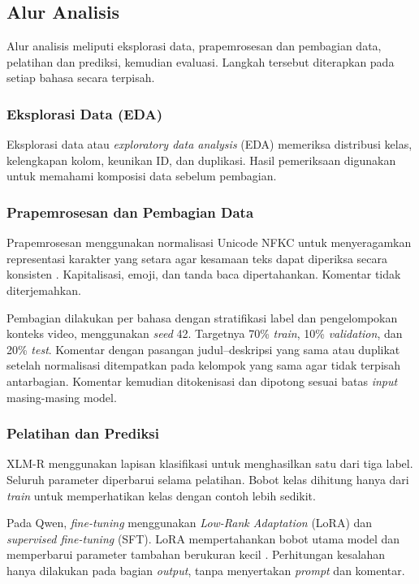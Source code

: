 \documentclass[11pt]{article}
\begin{document}
\subsection{Alur Analisis}
Alur analisis meliputi eksplorasi data, prapemrosesan dan pembagian data, pelatihan dan prediksi, kemudian evaluasi. Langkah tersebut diterapkan pada setiap bahasa secara terpisah.

\subsubsection{Eksplorasi Data (EDA)}
Eksplorasi data atau \textit{exploratory data analysis} (EDA) memeriksa distribusi kelas, kelengkapan kolom, keunikan ID, dan duplikasi. Hasil pemeriksaan digunakan untuk memahami komposisi data sebelum pembagian.

\subsubsection{Prapemrosesan dan Pembagian Data}
Prapemrosesan menggunakan normalisasi Unicode NFKC untuk menyeragamkan representasi karakter yang setara agar kesamaan teks dapat diperiksa secara konsisten \citep{unicode-consortium-2026-normalization}. Kapitalisasi, emoji, dan tanda baca dipertahankan. Komentar tidak diterjemahkan.

Pembagian dilakukan per bahasa dengan stratifikasi label dan pengelompokan konteks video, menggunakan \textit{seed} 42. Targetnya 70\% \textit{train}, 10\% \textit{validation}, dan 20\% \textit{test}. Komentar dengan pasangan judul--deskripsi yang sama atau duplikat setelah normalisasi ditempatkan pada kelompok yang sama agar tidak terpisah antarbagian. Komentar kemudian ditokenisasi dan dipotong sesuai batas \textit{input} masing-masing model.

\subsubsection{Pelatihan dan Prediksi}
XLM-R menggunakan lapisan klasifikasi untuk menghasilkan satu dari tiga label. Seluruh parameter diperbarui selama pelatihan. Bobot kelas dihitung hanya dari \textit{train} untuk memperhatikan kelas dengan contoh lebih sedikit.

Pada Qwen, \textit{fine-tuning} menggunakan \textit{Low-Rank Adaptation} (LoRA) dan \textit{supervised fine-tuning} (SFT). LoRA mempertahankan bobot utama model dan memperbarui parameter tambahan berukuran kecil \citep{hu-etal-2021-lora}. Perhitungan kesalahan hanya dilakukan pada bagian \textit{output}, tanpa menyertakan \textit{prompt} dan komentar.
\end{document}
